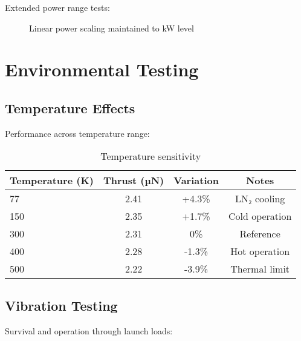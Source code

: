 \documentclass[12pt,letterpaper]{book}
\theoremstyle{definition}
\theoremstyle{plain}
\theoremstyle{remark}
\begin{document}
{{{{{Extended power range tests:

\begin{figure}[h]
\centering
{}
\caption{Linear power scaling maintained to kW level}
\end{figure}

\section{Environmental Testing}

\subsection{Temperature Effects}

Performance across temperature range:

\begin{table}[h]
\centering
\caption{Temperature sensitivity}
\begin{tabular}{lccc}
\toprule
Temperature (K) & Thrust (µN) & Variation & Notes \\
\midrule
77 & 2.41 & +4.3\% & LN₂ cooling \\
150 & 2.35 & +1.7\% & Cold operation \\
300 & 2.31 & 0\% & Reference \\
400 & 2.28 & -1.3\% & Hot operation \\
500 & 2.22 & -3.9\% & Thermal limit \\
\bottomrule
\end{tabular}
\end{table}

\subsection{Vibration Testing}

Survival and operation through launch loads:

}}}}}
\end{document}
